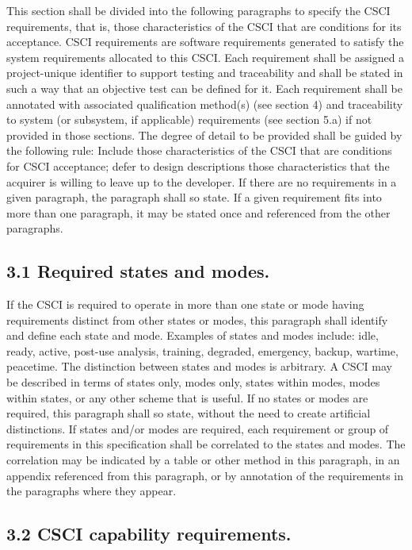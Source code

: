 This section shall be divided into the following paragraphs to specify
the CSCI requirements, that is, those characteristics of the CSCI that
are conditions for its acceptance. CSCI requirements are software
requirements generated to satisfy the system requirements allocated to
this CSCI. Each requirement shall be assigned a project-unique
identifier to support testing and traceability and shall be stated in
such a way that an objective test can be defined for it. Each
requirement shall be annotated with associated qualification method(s)
(see section 4) and traceability to system (or subsystem, if applicable)
requirements (see section 5.a) if not provided in those sections. The
degree of detail to be provided shall be guided by the following rule:
Include those characteristics of the CSCI that are conditions for CSCI
acceptance; defer to design descriptions those characteristics that the
acquirer is willing to leave up to the developer. If there are no
requirements in a given paragraph, the paragraph shall so state. If a
given requirement fits into more than one paragraph, it may be stated
once and referenced from the other paragraphs.

\subsection{3.1 Required states and modes.}

If the CSCI is required to operate in more than one state or mode having
requirements distinct from other states or modes, this paragraph shall
identify and define each state and mode. Examples of states and modes
include: idle, ready, active, post-use analysis, training, degraded,
emergency, backup, wartime, peacetime. The distinction between states
and modes is arbitrary. A CSCI may be described in terms of states only,
modes only, states within modes, modes within states, or any other
scheme that is useful. If no states or modes are required, this
paragraph shall so state, without the need to create artificial
distinctions. If states and/or modes are required, each requirement or
group of requirements in this specification shall be correlated to the
states and modes. The correlation may be indicated by a table or other
method in this paragraph, in an appendix referenced from this paragraph,
or by annotation of the requirements in the paragraphs where they
appear.

\subsection{3.2 CSCI capability requirements.}

